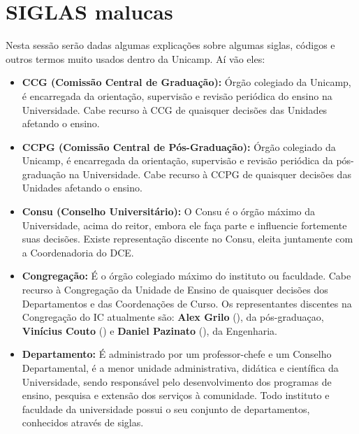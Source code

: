 
\section{SIGLAS malucas}

Nesta sessão serão dadas algumas explicações sobre algumas siglas, códigos
e outros termos muito usados dentro da Unicamp. Aí vão eles:

\begin{itemize}
    \item  \textbf{CCG (Comissão Central de Graduação):} Órgão colegiado da
        Unicamp, é encarregada da orientação, supervisão e revisão periódica do
        ensino na Universidade. Cabe recurso à CCG de quaisquer decisões das
        Unidades afetando o ensino.

    \item  \textbf{CCPG (Comissão Central de Pós-Graduação):} Órgão colegiado da
        Unicamp, é encarregada da orientação, supervisão e revisão periódica da
        pós-graduação na Universidade. Cabe recurso à CCPG de quaisquer decisões
        das Unidades afetando o ensino.

    \item  \textbf{Consu (Conselho Universitário):} O Consu é o órgão máximo da
        Universidade, acima do reitor, embora ele faça parte e influencie
        fortemente suas decisões.  Existe representação discente no Consu,
        eleita juntamente com a Coordenadoria do DCE.

    \item  \textbf{Congregação:} É o órgão colegiado máximo do instituto ou
        faculdade.  Cabe recurso à Congregação da Unidade de Ensino de quaisquer
        decisões dos Departamentos e das Coordenações de Curso. Os
        representantes discentes na Congregação do IC atualmente são:
        \textbf{Alex Grilo} (), da pós-graduaçao,
        \textbf{Vinícius Couto} () e \textbf{Daniel
        Pazinato} (), da Engenharia.

    \item  \textbf{Departamento:} É administrado por um professor-chefe e um
        Conselho Departamental, é a menor unidade administrativa, didática e
        científica da Universidade, sendo responsável pelo desenvolvimento dos
        programas de ensino, pesquisa e extensão dos serviços à comunidade. Todo
        instituto e faculdade da universidade possui o seu conjunto de
        departamentos, conhecidos através de siglas.


\end{itemize}
